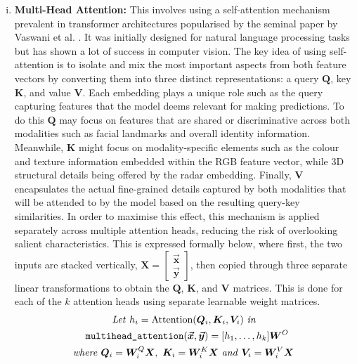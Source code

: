 \documentclass{mpaper}
\newcommand{\verbtt}[1]{
  \text{\normalfont\ttfamily\detokenize{#1}}
}
\begin{document}
\begin{enumerate}[i.]
    \item \textbf{Multi-Head Attention:} This involves using a self-attention mechanism prevalent in transformer architectures popularised by the seminal paper by Vaswani et al. \cite{vaswani2017attention}. It was initially designed for natural language processing tasks but has shown a lot of success in computer vision. The key idea of using self-attention is to isolate and mix the most important aspects from both feature vectors by converting them into three distinct representations: a query $\bm{Q}$, key $\bm{K}$, and value $\bm{V}$. Each embedding plays a unique role such as the query capturing features that the model deems relevant for making predictions. To do this $\bm{Q}$ may focus on features that are shared or discriminative across both modalities such as facial landmarks and overall identity information. Meanwhile, $\bm{K}$ might focus on modality-specific elements such as the colour and texture information embedded within the RGB feature vector, while 3D structural details being offered by the radar embedding. Finally, $\bm{V}$ encapsulates the actual fine-grained details captured by both modalities that will be attended to by the model based on the resulting query-key similarities. In order to maximise this effect, this mechanism is applied separately across multiple attention heads, reducing the risk of overlooking salient characteristics.
    This is expressed formally below, where first, the two inputs are stacked vertically, $\bm{X} = \begin{bmatrix} \bm{\vec{x}} \\ \bm{\vec{y}} \end{bmatrix}$, then copied through three separate linear transformations to obtain the $\bm{Q}$, $\bm{K}$, and $\bm{V}$ matrices. This is done for each of the $k$ attention heads using separate learnable weight matrices.
    \begin{align*}
        \mathit{Let} \ h_i = \text{Attention}(\bm{Q}_i&, \bm{K}_i, \bm{V}_i) \ \mathit{in} \\
        \hspace{-1cm}\verbtt{multihead_attention}(\bm{\vec{x}}, \bm{\vec{y}}) &= [h_1, \ldots, h_k]\bm{W}^O \\
        \mathit{where} \ 
        \bm{Q}_i = \bm{W}^{Q}_i\bm{X}, \ \bm{K}_i = \bm{W}^{K}_i&\bm{X} \ \mathit{and} \ \bm{V}_i = \bm{W}^{V}_i\bm{X}
    \end{align*}
\end{enumerate}
\end{document}
